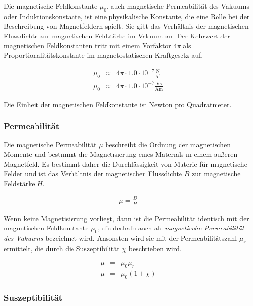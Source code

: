 \documentclass[12pt,a4paper]{scrartcl}
\numberwithin{equation}{section} %
\newcommand{\pu}[1]{\ensuremath{\mathrm{#1}}}
\renewcommand{\[}{} %
\renewcommand{\]}{\noindent} %
\begin{document}
Die magnetische Feldkonstante \(\mu_0\), auch magnetische Permeabilität
des Vakuums oder Induktionskonstante, ist eine physikalische Konstante,
die eine Rolle bei der Beschreibung von Magnetfeldern spielt. Sie gibt
das Verhältnis der magnetischen Flussdichte zur magnetischen Feldstärke
im Vakuum an. Der Kehrwert der magnetischen Feldkonstanten tritt mit
einem Vorfaktor \(4\pi\) als Proportionalitätskonstante im
magnetostatischen Kraftgesetz auf.

\[
\begin{eqnarray}
    \mu_0 &\approx& 4\pi \cdot \pu{1.0 \cdot 10^{-7} \frac{N}{A^2}} \\
    \mu_0 &\approx& 4\pi \cdot \pu{1.0 \cdot 10^{-7} \frac{Vs}{Am}}
\end{eqnarray}
\]

Die Einheit der magnetischen Feldkonstante ist Newton pro Quadratmeter.

\hypertarget{permeabilituxe4t}{%
\subsubsection{Permeabilität}\label{permeabilituxe4t}}

Die magnetische Permeabilität \(\mu\) beschreibt die Ordnung der
magnetischen Momente und bestimmt die Magnetisierung eines Materials in
einem äußeren Magnetfeld. Es bestimmt daher die Durchlässigkeit von
Materie für magnetische Felder und ist das Verhältnis der magnetischen
Flussdichte \(B\) zur magnetische Feldstärke \(H\).

\[
\begin{eqnarray}
    \mu = \frac{B}{H}
\end{eqnarray}
\]

Wenn keine Magnetisierung vorliegt, dann ist die Permeabilität identisch
mit der magnetischen Feldkonstante \(\mu_0\), die deshalb auch als
\emph{magnetische Permeabilität des Vakuums} bezeichnet wird. Ansonsten
wird sie mit der Permeabilitätszahl \(\mu_r\) ermittelt, die durch die
Suszeptibilität \(\chi\) beschrieben wird.

\[
\begin{eqnarray}
    \mu &=& \mu_0\mu_r \\
    \mu &=& \mu_0(1+\chi)
\end{eqnarray}
\]

\hypertarget{suszeptibilituxe4t}{%
\subsubsection{Suszeptibilität}\label{suszeptibilituxe4t}}
\end{document}
